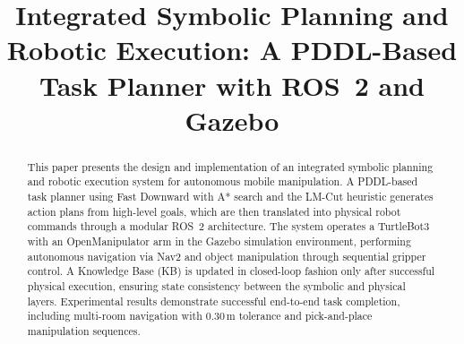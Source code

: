 \documentclass[conference]{IEEEtran}
\begin{document}
\title{Integrated Symbolic Planning and Robotic Execution: A PDDL-Based Task Planner with ROS~2 and Gazebo}

\author{
\and
{}
\and
{}
\and
{}
\and
{}
}

\maketitle

\begin{abstract}
This paper presents the design and implementation of an integrated symbolic planning and robotic execution system for autonomous mobile manipulation. A PDDL-based task planner using Fast Downward with A* search and the LM-Cut heuristic generates action plans from high-level goals, which are then translated into physical robot commands through a modular ROS~2 architecture. The system operates a TurtleBot3 with an OpenManipulator arm in the Gazebo simulation environment, performing autonomous navigation via Nav2 and object manipulation through sequential gripper control. A Knowledge Base (KB) is updated in closed-loop fashion only after successful physical execution, ensuring state consistency between the symbolic and physical layers. Experimental results demonstrate successful end-to-end task completion, including multi-room navigation with 0.30\,m tolerance and pick-and-place manipulation sequences.
\end{abstract}
\end{document}
